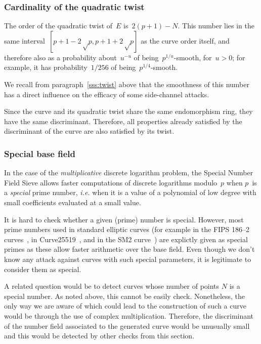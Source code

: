\documentclass[twocolumn,letterpaper]{article}
\begin{document}
\subsubsection{Cardinality of the quadratic twist}
\label{sss:normal-twist}

The order of the quadratic twist of~$E$ is~$2(p+1) - N$.
This number lies in the same interval~$[p+1-2√p, p+1+2√p]$
as the curve order itself,
and therefore also as a probability about~$u^{-u}$
of being~$p^{1/u}$-smooth, for~$u > 0$;
for example, it has probability~$1/256$ of being~$p^{1/4}$-smooth.

We recall from paragraph~\ref{sss:twist} above
that the smoothness of this number has a direct influence
on the efficacy of some side-channel attacks.

Since the curve and its quadratic twist
share the same endomorphism ring,
they have the same discriminant.
Therefore, all properties already satisfied
by the discriminant of the curve are also satisfied by its twist.

\subsubsection{Special base field}
\label{sss:special-anormal}

In the case of the \emph{multiplicative} discrete logarithm problem,
the Special Number Field Sieve allows faster computations
of discrete logarithms modulo~$p$
when $p$~is a \emph{special} prime number,
\emph{i.e.} when it is a value of a polynomial of low degree
with small coefficients evaluated at a small value.

It is hard to check whether a given (prime) number is special.
However, most prime numbers used in standard elliptic curves
(for example in the FIPS 186--2 curves~\cite{nist2000fips186-2},
in Curve25519~\cite{pkc2006bernstein},
and in the SM2 curve~\cite{oscca2010sm2})
are explictly given as special primes as these allow faster arithmetic
over the base field.
Even though we don't know any attack against curves with such special
parameters, it is legitimate to consider them as special.

A related question would be to detect curves whose number of points $N$
is a special number.
As noted above, this cannot be easily check.
Nonetheless, the only way we are aware of which could lead to the construction
of such a curve would be through the use of complex multiplication.
Therefore, the discriminant of the number field associated
to the generated curve would be unusually small and this would be detected by
other checks from this section.
\end{document}

